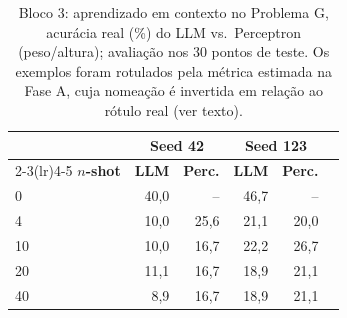 \documentclass[12pt,a4paper]{article}
\providecommand{\DIFaddbegin}{} %
\providecommand{\DIFaddend}{} %
\providecommand{\DIFdelbegin}{} %
\providecommand{\DIFdelend}{} %
\providecommand{\DIFscaledelfig}{0.5}
\newlength{\DIFdelgraphicswidth} %
\newlength{\DIFdelgraphicsheight} %
\providecommand{\DIFaddincludegraphics}[2][]{{\color{blue}\fbox{\DIFOincludegraphics[#1]{#2}}}} %
\providecommand{\DIFdelincludegraphics}[2][]{%
\sbox{\DIFdelgraphicsbox}{\DIFOincludegraphics[#1]{#2}}%
\settoboxwidth{\DIFdelgraphicswidth}{\DIFdelgraphicsbox} %
\settoboxtotalheight{\DIFdelgraphicsheight}{\DIFdelgraphicsbox} %
\scalebox{\DIFscaledelfig}{%
\parbox[b]{\DIFdelgraphicswidth}{\usebox{\DIFdelgraphicsbox}\\[-\baselineskip] \rule{\DIFdelgraphicswidth}{0em}}\llap{\resizebox{\DIFdelgraphicswidth}{\DIFdelgraphicsheight}{%
\setlength{\unitlength}{\DIFdelgraphicswidth}%
\begin{picture}(1,1)%
\thicklines\linethickness{2pt} %
{\color[rgb]{1,0,0}\put(0,0){\framebox(1,1){}}}%
{\color[rgb]{1,0,0}\put(0,0){\line( 1,1){1}}}%
{\color[rgb]{1,0,0}\put(0,1){\line(1,-1){1}}}%
\end{picture}%
}\hspace*{3pt}}} %
} %
\DeclareRobustCommand{\DIFaddbegin}{\DIFOaddbegin \let\includegraphics\DIFaddincludegraphics} %
\DeclareRobustCommand{\DIFaddend}{\DIFOaddend \let\includegraphics\DIFOincludegraphics} %
\DeclareRobustCommand{\DIFdelbegin}{\DIFOdelbegin \let\includegraphics\DIFdelincludegraphics} %
\DeclareRobustCommand{\DIFdelend}{\DIFOaddend \let\includegraphics\DIFOincludegraphics} %
\begin{document}
\DIFdelbegin %
\DIFdelend \DIFaddbegin \begin{table}[ht]
\centering
\caption{Bloco 3: aprendizado em contexto no Problema G, acurácia real (\%) do LLM vs.\
Perceptron (peso/altura); avaliação nos $30$ pontos de teste. Os exemplos foram rotulados
pela métrica estimada na Fase A, cuja nomeação é invertida em relação ao rótulo real (ver
texto).}
\label{tab:real_e}
\begin{tabular}{lrrrrr}
\toprule
& \multicolumn{2}{c}{\textbf{Seed 42}} & \multicolumn{2}{c}{\textbf{Seed 123}} \\
\cmidrule(lr){2-3}\cmidrule(lr){4-5}
\textbf{$n$-shot} & \textbf{LLM} & \textbf{Perc.} & \textbf{LLM} & \textbf{Perc.} \\
\midrule
0  & 40,0 & --   & 46,7 & --   \\
4  & 10,0 & 25,6 & 21,1 & 20,0 \\
10 & 10,0 & 16,7 & 22,2 & 26,7 \\
20 & 11,1 & 16,7 & 18,9 & 21,1 \\
40 &  8,9 & 16,7 & 18,9 & 21,1 \\
\bottomrule
\end{tabular}
\end{table}
\DIFaddend 
\end{document}
